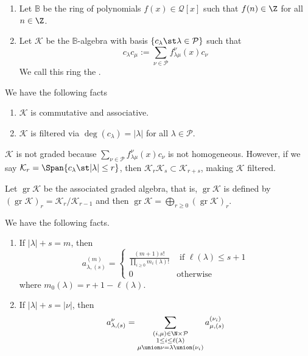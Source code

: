 \documentclass[11pt,leqno,oneside]{amsbook}
\newcommand{\partitions}{\mathcal{P}} %
\newcommand{\B}{\mathbb{B}}
\newcommand{\K}{\mathcal{K}} %
\DeclareMathOperator{\gr}{gr}
\numberwithin{thm}{section}
\begin{document}
\begin{defn}
  \begin{enumerate}
  \item  Let \(\B\) be the ring of polynomials \(f(x) \in \mathcal{Q}[x]\) such that
  \(f(n) \in \Z\) for all \(n \in \Z\).
  \item Let \(\K\) be the \(\B\)-algebra with basis \(\{c_\lambda \st
    \lambda \in \partitions\}\) such that \[
      c_\lambda c_\mu := \sum_{\nu \in \partitions} f_{\lambda
        \mu}^\nu(x) c_\nu
    \]
    We call this ring the .
  \end{enumerate}
\end{defn}
\begin{prop}
  We have the following facts
  \begin{enumerate}
  \item \(\K\) is commutative and associative.
  \item \(\K\) is filtered via \(\deg(c_\lambda) = |\lambda|\) for all
    \(\lambda \in \partitions\).
  \end{enumerate}
\end{prop}
\begin{rmk}
  \(\K\) is not graded because \(\sum_{\nu \in \partitions} f_{\lambda
  \mu}^\nu(x) c_\nu\) is not homogeneous. However, if we say \(\K_r =
  \Span\{c_\lambda \st |\lambda| \leq r\}\), then \(\K_r \K_s \subset
  \K_{r+s}\), making \(\K\) filtered. 
\end{rmk}
\begin{defn}
  Let \(\gr \K\) be the associated graded algebra, that is, \(\gr \K\)
  is defined by \((\gr
  \K)_r = \K_r/\K_{r-1}\) and then \(\gr \K = \bigoplus_{r \geq 0}
  (\gr \K)_r\).
\end{defn}
\begin{lem}
  We have the following facts.
  \begin{enumerate}
  \item   If \(|\lambda|+s = m\), then \[
    a_{\lambda,(s)}^{(m)} =
    \begin{cases}
      \frac{(m+1)s!}{\prod_{i \geq 0} m_i(\lambda)!} & \text{ if
      }\ell(\lambda) \leq s+1\\
      0 & \text{otherwise}
    \end{cases}
  \]
  where \(m_0(\lambda) = r+1-\ell(\lambda)\).
\item If \(|\lambda|+s = |\nu|\), then \[
    a_{\lambda,(s)}^\nu = \sum_{\substack{(i,\mu) \in \N \times
        \partitions  \\
        1 \leq i \leq \ell(\lambda) \\ \mu \union \nu = \lambda \union
      (\nu_i)}} a_{\mu,(s)}^{(\nu_i)}
  \]
  
  \end{enumerate}
\end{lem}
\end{document}
